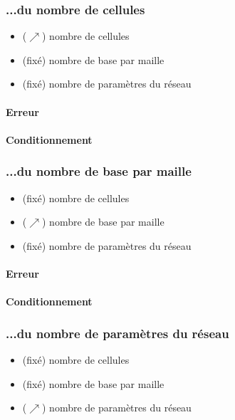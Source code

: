 \documentclass[12pt,a4paper]{article}
\let\oldparagraph\paragraph
\renewcommand{\paragraph}[1]{\oldparagraph{#1}\leavevmode}
\begin{document}
\subsubsection{...du nombre de cellules}

\begin{itemize}
    \item ($\nearrow$) nombre de cellules
    \item (fixé) nombre de base par maille
    \item (fixé) nombre de paramètres du réseau
\end{itemize}

\paragraph{Erreur}

\paragraph{Conditionnement}

\subsubsection{...du nombre de base par maille}

\begin{itemize}
    \item (fixé) nombre de cellules
    \item ($\nearrow$) nombre de base par maille
    \item (fixé) nombre de paramètres du réseau
\end{itemize}

\paragraph{Erreur}

\paragraph{Conditionnement}

\subsubsection{...du nombre de paramètres du réseau}

\begin{itemize}
    \item (fixé) nombre de cellules
    \item (fixé) nombre de base par maille
    \item ($\nearrow$) nombre de paramètres du réseau
\end{itemize}
\end{document}
